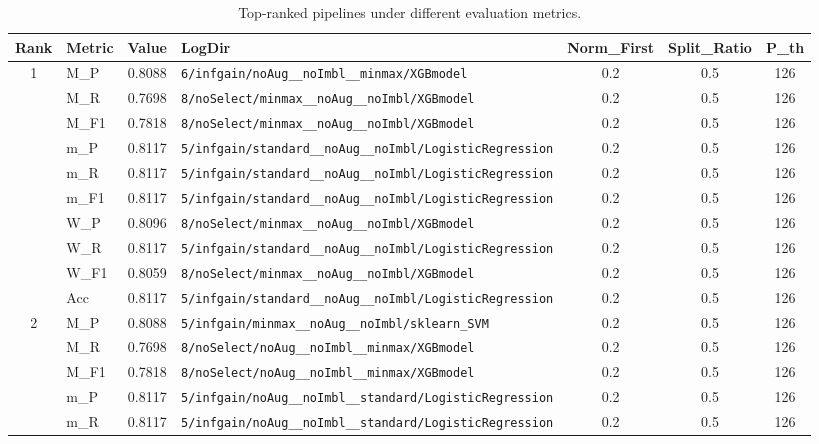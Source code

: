 \begin{table}[htbp]
\caption{Top-ranked pipelines under different evaluation metrics.}
\label{tab:rank_metric_vertical}
\centering
\small
\setlength{\tabcolsep}{4pt}
\begin{tabular}{|c|l|c|>{\ttfamily\footnotesize}p{7.2cm}|c|c|c|}
\hline
Rank & Metric & Value & LogDir & Norm\_First & Split\_Ratio & P\_th \\
\hline
\multirow{10}{*}{1} & M\_P & 0.8088 & \texttt{6/infgain/noAug\_\_noImbl\_\_minmax/XGBmodel} & 0.2 & 0.5  & 126 \\ 
 & M\_R & 0.7698 & \texttt{8/noSelect/minmax\_\_noAug\_\_noImbl/XGBmodel} & 0.2 & 0.5  & 126 \\ 
 & M\_F1 & 0.7818 & \texttt{8/noSelect/minmax\_\_noAug\_\_noImbl/XGBmodel} & 0.2 & 0.5  & 126 \\ 
 & m\_P & 0.8117 & \texttt{5/infgain/standard\_\_noAug\_\_noImbl/LogisticRegression} & 0.2 & 0.5  & 126 \\ 
 & m\_R & 0.8117 & \texttt{5/infgain/standard\_\_noAug\_\_noImbl/LogisticRegression} & 0.2 & 0.5  & 126 \\ 
 & m\_F1 & 0.8117 & \texttt{5/infgain/standard\_\_noAug\_\_noImbl/LogisticRegression} & 0.2 & 0.5  & 126 \\ 
 & W\_P & 0.8096 & \texttt{8/noSelect/minmax\_\_noAug\_\_noImbl/XGBmodel} & 0.2 & 0.5  & 126 \\ 
 & W\_R & 0.8117 & \texttt{5/infgain/standard\_\_noAug\_\_noImbl/LogisticRegression} & 0.2 & 0.5  & 126 \\ 
 & W\_F1 & 0.8059 & \texttt{8/noSelect/minmax\_\_noAug\_\_noImbl/XGBmodel} & 0.2 & 0.5  & 126 \\ 
 & Acc & 0.8117 & \texttt{5/infgain/standard\_\_noAug\_\_noImbl/LogisticRegression} & 0.2 & 0.5  & 126 \\ 
\hline
\multirow{10}{*}{2} & M\_P & 0.8088 & \texttt{5/infgain/minmax\_\_noAug\_\_noImbl/sklearn\_SVM} & 0.2 & 0.5  & 126 \\ 
 & M\_R & 0.7698 & \texttt{8/noSelect/noAug\_\_noImbl\_\_minmax/XGBmodel} & 0.2 & 0.5  & 126 \\ 
 & M\_F1 & 0.7818 & \texttt{8/noSelect/noAug\_\_noImbl\_\_minmax/XGBmodel} & 0.2 & 0.5  & 126 \\ 
 & m\_P & 0.8117 & \texttt{5/infgain/noAug\_\_noImbl\_\_standard/LogisticRegression} & 0.2 & 0.5  & 126 \\ 
 & m\_R & 0.8117 & \texttt{5/infgain/noAug\_\_noImbl\_\_standard/LogisticRegression} & 0.2 & 0.5  & 126 \\ 

\end{tabular}
\end{table}
